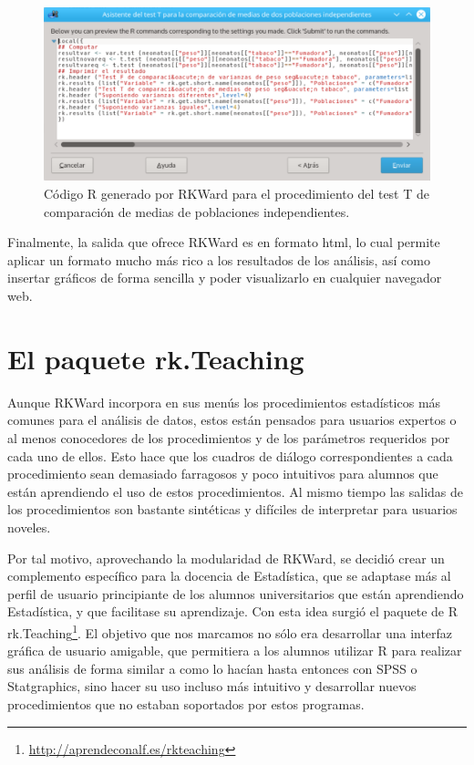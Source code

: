 \documentclass[a4paper,10pt,twoside]{article}
\newcommand{\rkteaching}{\textsf{rk.Teaching}}
\newcommand{\rkward}{\textsf{RKWard}}
\newcommand{\spss}{\textsf{SPSS}}
\newcommand{\statgraphics}{\textsf{Statgraphics}}
\begin{document}
\begin{figure}[htbp!]
\centering
\includegraphics[width=\textwidth]{img/codigo_t_test.png}
\caption{Código R generado por \rkward{} para el procedimiento del test T de comparación de medias de poblaciones
independientes.}
\label{f:codigo-test-t}
\end{figure}

Finalmente, la salida que ofrece \rkward{} es en formato html, lo cual permite aplicar un formato mucho más rico a los
resultados de los análisis, así como insertar gráficos de forma sencilla y poder visualizarlo en cualquier navegador web.
 

\section{El paquete \rkteaching}
\label{s:rkteaching}
Aunque \rkward{} incorpora en sus menús los procedimientos estadísticos más comunes para el análisis de datos, estos
están pensados para usuarios expertos o al menos conocedores de los procedimientos y de los parámetros requeridos por
cada uno de ellos. 
Esto hace que los cuadros de diálogo correspondientes a cada procedimiento sean demasiado farragosos y poco intuitivos
para alumnos que están aprendiendo el uso de estos procedimientos.
Al mismo tiempo las salidas de los procedimientos son bastante sintéticas y difíciles de interpretar para usuarios
noveles. 

Por tal motivo, aprovechando la modularidad de \rkward, se decidió crear un complemento específico para la docencia de
Estadística, que se adaptase más al perfil de usuario principiante de los alumnos universitarios que están aprendiendo
Estadística, y que facilitase su aprendizaje. 
Con esta idea surgió el paquete de R \rkteaching\footnote{\url{http://aprendeconalf.es/rkteaching}}.
El objetivo que nos marcamos no sólo era desarrollar una interfaz gráfica de usuario amigable, que permitiera a los
alumnos utilizar R para realizar sus análisis de forma similar a como lo hacían hasta entonces con \spss{} o \statgraphics{},
sino hacer su uso incluso más intuitivo y desarrollar nuevos procedimientos que no estaban soportados por estos
programas. 
\end{document}
